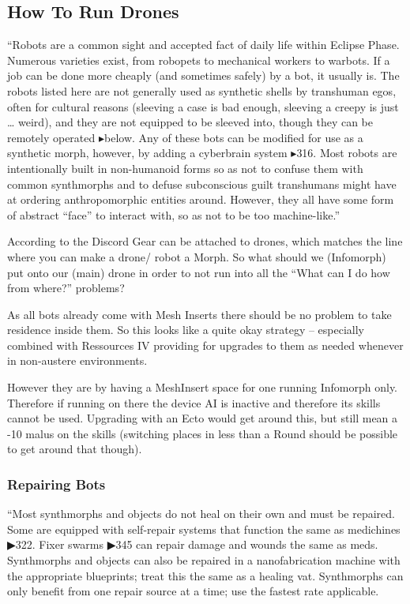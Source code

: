 
\subsection{How To Run Drones}

“Robots are a common sight and accepted fact of daily life within Eclipse Phase. Numerous varieties exist, from robopets to mechanical workers to warbots. If a job can be done more cheaply (and sometimes safely) by a bot, it usually is. The robots listed here are not generally used as synthetic shells by transhuman egos, often for cultural reasons (sleeving a case is bad enough, sleeving a creepy is just … weird), and they are not equipped to be sleeved into, though they can be remotely operated $\blacktriangleright$below. Any of these bots can be modified for use as a synthetic morph, however, by adding a cyberbrain system $\blacktriangleright$316. Most robots are intentionally built in non-humanoid forms so as not to confuse them with common synthmorphs and to defuse subconscious guilt transhumans might have at ordering anthropomorphic entities around. However, they all have some form of abstract “face” to interact with, so as not to be too machine-like.” \citep[pg. 346]{ep2e_1.1_2019}

According to the Discord Gear can be attached to drones, which matches the line where you can make a drone/ robot a Morph. So what should we (Infomorph) put onto our (main) drone in order to not run into all the “What can I do how from where?” problems?

As all bots already come with Mesh Inserts there should be no problem to take residence inside them. So this looks like a quite okay strategy -- especially combined with Ressources IV providing for upgrades to them as needed whenever in non-austere environments.

However they are by having a \gls{MeshInsert} space for one running Infomorph only. Therefore if running on there the device AI is inactive and therefore its skills cannot be used. \citep[pg. 244]{ep2e_1.1_2019} Upgrading with an \gls{Ecto} would get around this, but still mean a -10 malus on the skills (switching places in less than a Round should be possible to get around that though).

\subsubsection{Repairing Bots}

“Most synthmorphs and objects do not heal on their own and must be repaired. Some are equipped with self-repair systems that function the same as medichines ▶322. Fixer swarms ▶345 can repair damage and wounds the same as meds. Synthmorphs and objects can also be repaired in a nanofabrication machine with the appropriate blueprints; treat this the same as a healing vat. Synthmorphs can only benefit from one repair source at a time; use the fastest rate applicable.

